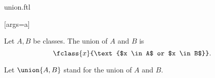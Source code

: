 \documentclass{article}
\begin{document}
\begin{smodule}[creators={Marcel Schütz}]{union.ftl}

  [args=a]{}

  \begin{definition}[label=2159753924968448]
    Let $A, B$ be classes.
    The union of $A$ and $B$ is
    \[\fclass{x}{\text{$x \in A$ or $x \in B$}}.\]
  \end{definition}

  \begin{fconvention*}
    Let $\union{A,B}$ stand for the union of $A$ and $B$.
  \end{fconvention*}
\end{smodule}
\end{document}
